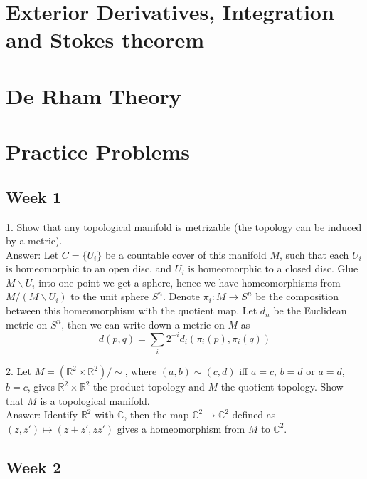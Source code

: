 \documentclass{article}
\theoremstyle{definition}
\begin{document}
\newpage

\section{Exterior Derivatives, Integration and Stokes theorem}

\section{De Rham Theory}

\newpage
\appendix

\section{Practice Problems}

\subsection{Week 1}

1. Show that any topological manifold is metrizable (the topology can be induced by a metric).\\

Answer: Let $C=\{U_i\}$ be a countable cover of this manifold $M$, such that each $U_i$ is homeomorphic to an open disc, and $\overline{U_i}$ is homeomorphic to a closed disc. Glue $M\backslash U_i$ into one point we get a sphere, hence we have homeomorphisms from $M/(M\backslash U_i)$ to the unit sphere $S^n$. Denote $\pi_i: M\rightarrow S^n$ be the composition between this homeomorphism with the quotient map. Let $d_n$ be the Euclidean metric on $S^n$, then we can write down a metric on $M$ as 
\[d(p, q)=\sum_i 2^{-i}d_i(\pi_i(p), \pi_i(q))\]

2. Let $M=(\mathbb{R}^2\times\mathbb{R}^2)/\sim$, where $(a, b)\sim (c, d)$ iff $a=c$, $b=d$ or $a=d$, $b=c$, gives $\mathbb{R}^2\times\mathbb{R}^2$ the product topology and $M$ the quotient topology. Show that $M$ is a topological manifold.\\

Answer: Identify $\mathbb{R}^2$ with $\mathbb{C}$, then the map $\mathbb{C}^2\rightarrow \mathbb{C}^2$ defined as $(z, z')\mapsto (z+z', zz')$ gives a homeomorphism from $M$ to $\mathbb{C}^2$.

\subsection{Week 2}
\end{document}
